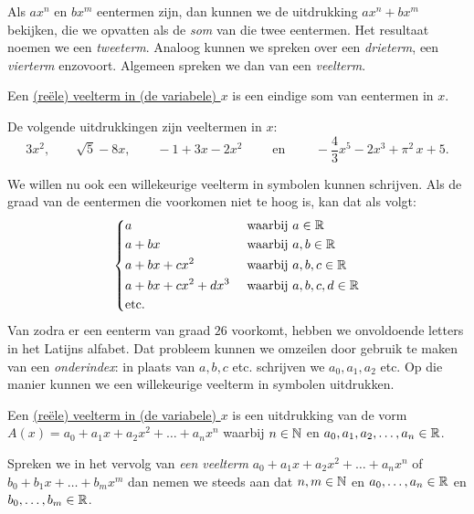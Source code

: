 \documentclass{ximera}
\begin{document}
Als $ax^n$ en $bx^m$ eentermen zijn, dan kunnen we de uitdrukking $ax^n + bx^m$ bekijken, die we opvatten als de {\em som} van die twee eentermen. Het resultaat noemen we een {\em tweeterm}. Analoog kunnen we spreken over een {\em drieterm}, een {\em vierterm} enzovoort. Algemeen spreken we dan van een {\em veelterm}.

\begin{definitie}[in woorden]
Een \underline{(re\"ele) veelterm in (de variabele) $x$} is een eindige som van eentermen in $x$.
\end{definitie}

\begin{voorbeeld}
De volgende uitdrukkingen zijn veeltermen in $x$:
\[
3x^2, \qquad \sqrt{5} - 8x, \qquad -1 + 3x -2x^2 \qquad \text{ en } \qquad -\frac{4}{3}x^5 - 2x^3 + \pi^2\,x + 5. 
\]
\end{voorbeeld}

We willen nu ook een willekeurige veelterm in symbolen kunnen schrijven. Als de graad van de eentermen die voorkomen niet te hoog is, kan dat als volgt:
\begin{align*} 
\left\{
\begin{aligned}
& a && \text{ waarbij } a \in \mathbb{R}  \\
& a + bx && \text{ waarbij } a,b \in \mathbb{R}  \\
& a + bx + cx^2 && \text{ waarbij } a,b,c \in \mathbb{R}  \\
& a + bx + cx^2 + dx^3 && \text{ waarbij } a,b,c,d \in \mathbb{R} \\
& \text{etc.} && 
\end{aligned}
\right.
\end{align*}
Van zodra er een eenterm van graad $26$ voorkomt, hebben we onvoldoende letters in het Latijns alfabet. Dat probleem kunnen we omzeilen door gebruik te maken van een {\em onderindex}\:: in plaats van $a,b,c$ etc. schrijven we $a_0, a_1, a_2$ etc. Op die manier kunnen we een willekeurige veelterm in symbolen uitdrukken.

\begin{definitie}[in symbolen]
Een \underline{(re\"ele) veelterm in (de variabele) $x$} is een uitdrukking van de vorm $A(x) = a_0 + a_1x + a_2x^2 + \dots + a_n x^n$ waarbij $n \in \mathbb{N}$ en $a_0,a_1,a_2,\ldots,a_n \in \mathbb{R}$.
\end{definitie}

Spreken we in het vervolg van {\em een veelterm} $a_0 + a_1x + a_2x^2 + \dots + a_n x^n$ of $b_0 + b_1x + \dots + b_m x^m$ dan nemen we steeds aan dat $n,m\in \mathbb{N}$ en $a_0, \ldots, a_n\in \mathbb{R}$ en $b_0, \ldots, b_m\in \mathbb{R}$.
\end{document}

